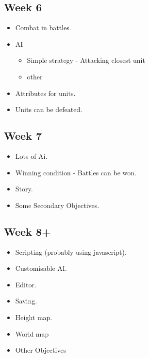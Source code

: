 	\subsection{Week 6}
	\label{week6}

	\begin{itemize}
	\item Combat in battles.

	\item AI

	\begin{itemize}
	\item Simple strategy - Attacking closest unit

	\item other

	\end{itemize}

	\item Attributes for units.

	\item Units can be defeated.

	\end{itemize}

	\subsection{Week 7}
	\label{week7}

	\begin{itemize}
	\item Lots of Ai.

	\item Winning condition - Battles can be won.

	\item Story.

	\item Some Secondary Objectives.

	\end{itemize}

	\subsection{Week 8+}
	\label{week8}

	\begin{itemize}
	\item Scripting (probably using javascript).

	\item Customisable AI.

	\item Editor.

	\item Saving.

	\item Height map.

	\item World map

	\item Other Objectives

	\end{itemize}

